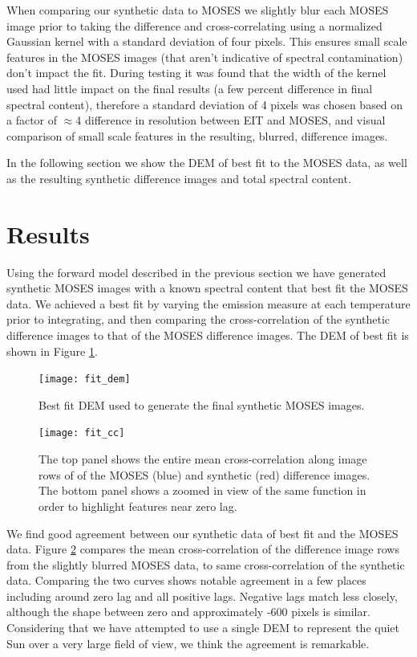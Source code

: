 		When comparing our synthetic data to MOSES we slightly blur each MOSES image prior to taking the difference and cross-correlating using a normalized Gaussian kernel with a standard deviation of four pixels.
		This ensures small scale features in the MOSES images (that aren't indicative of spectral contamination) don't impact the fit.
		During testing it was found that the width of the kernel used had little impact on the final results (a few percent difference in final spectral content), therefore a standard deviation of 4 pixels was chosen based on a factor of $\approx$4 difference in resolution between EIT and MOSES, and visual comparison of small scale features in the resulting, blurred, difference images.
		
		In the following section we show the DEM of best fit to the MOSES data, as well as the resulting synthetic difference images and total spectral content.
	

\section{Results}\label{sec:results}
	Using the forward model described in the previous section we have generated synthetic MOSES images with a known spectral content that best fit the MOSES data.
	We achieved a best fit by varying the emission measure at each temperature prior to integrating, and then comparing the cross-correlation of the synthetic difference images to that of the MOSES difference images.
	The DEM of best fit is shown in Figure \ref{fig:dem}.
	
	\begin{figure}
		\centering
		\texttt{[image: fit\_dem]}
		\caption{Best fit DEM used to generate the final synthetic MOSES images.
		}
		\label{fig:dem}
	\end{figure}

	\begin{figure}
		\centering
		\texttt{[image: fit\_cc]}
		\caption{The top panel shows the entire mean cross-correlation along image rows of of the MOSES (blue) and synthetic (red) difference images.  The bottom panel shows a zoomed in view of the same function in order to highlight features near zero lag.}
		\label{fig:fit_cc}
	\end{figure}
	
	We find good agreement between our synthetic data of best fit and the MOSES data.
	Figure \ref{fig:fit_cc} compares the mean cross-correlation of the difference image rows from the slightly blurred MOSES data, to same cross-correlation of the synthetic data.
	Comparing the two curves shows notable agreement in a few places including around zero lag and all positive lags.
	Negative lags match less closely, although the shape between zero and approximately -600 pixels is similar. 
	Considering that we have attempted to use a single DEM to represent the quiet Sun over a very large field of view, we think the agreement is remarkable.

